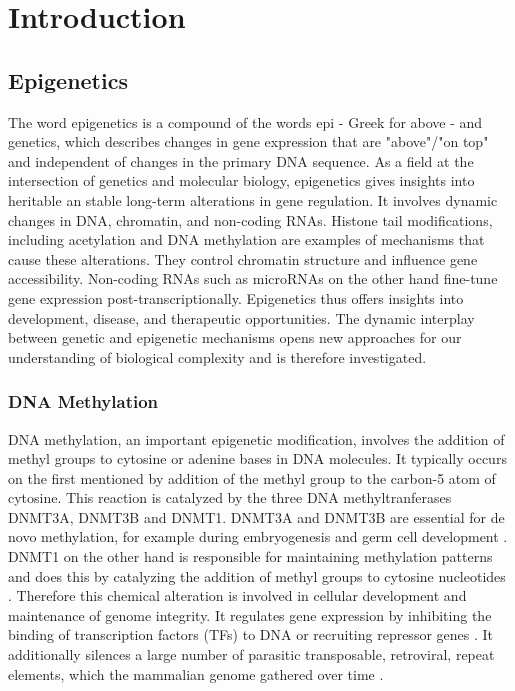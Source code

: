 \documentclass[pdftex,12pt,a4paper]{report}
\begin{document}
\chapter{Introduction}

\section{Epigenetics}
The word epigenetics is a compound of the words epi - Greek for above - and genetics, which describes changes in gene expression that are "above"/"on top" and independent of changes in the primary DNA sequence\cite{epigenetics2}.
As a field at the intersection of genetics and molecular biology, epigenetics gives insights into heritable an stable long-term alterations in gene regulation. It involves dynamic changes in DNA, chromatin, and non-coding RNAs. Histone tail modifications, including acetylation and DNA methylation are examples of mechanisms that cause these alterations. They control chromatin structure and influence gene accessibility\cite{epigenetics_histone}. Non-coding RNAs such as microRNAs on the other hand fine-tune gene expression post-transcriptionally. Epigenetics thus offers insights into development, disease, and therapeutic opportunities\cite{epigenetics_nonRNA}. The dynamic interplay between genetic and epigenetic mechanisms opens new approaches for our understanding of biological complexity and is therefore investigated.
\subsection{DNA Methylation}
DNA methylation, an important epigenetic modification, involves the addition of methyl groups to cytosine or adenine bases in DNA molecules. It typically occurs on the first mentioned by addition of the methyl group to the carbon-5 atom of cytosine. This reaction is catalyzed by the three DNA methyltranferases DNMT3A, DNMT3B and DNMT1. DNMT3A and DNMT3B are essential for de novo methylation, for example during embryogenesis and germ cell development \cite{methylation_dnmtsAB}. DNMT1 on the other hand is responsible for maintaining methylation patterns and does this by catalyzing the addition of methyl groups to cytosine nucleotides \cite{methylation_dnmts1}. Therefore this chemical alteration is involved in cellular development and maintenance of genome integrity. It regulates gene expression by inhibiting the binding of transcription factors (TFs) to DNA or recruiting repressor genes \cite{gene_regulation}. It additionally silences a large number of parasitic transposable, retroviral, repeat elements, which the mammalian genome gathered over time \cite{MethRole}.
\end{document}
